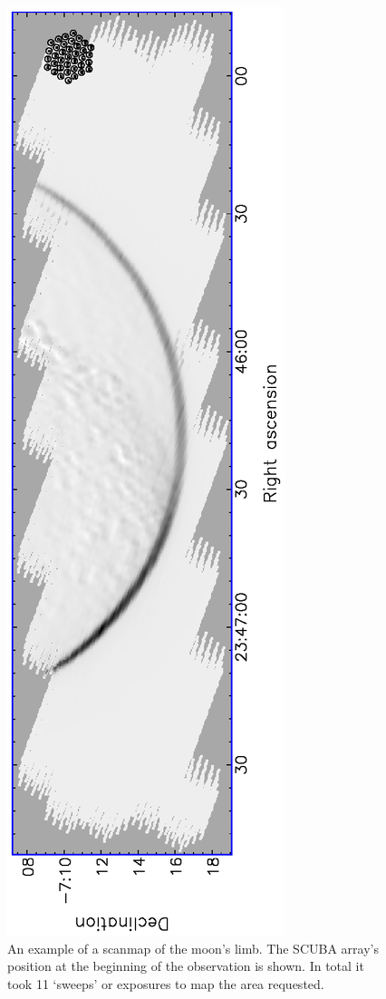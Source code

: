 \documentclass[twoside,11pt]{article}
\renewcommand{\_}{\texttt{\symbol{95}}}
\begin{document}
\begin{figure}
\begin{center}
\includegraphics[angle=-90,width=\textwidth]{sc11_fig8.eps}
\caption{An example of a scanmap of the moon's limb. The SCUBA 
array's position at the beginning of the observation is shown.  In
total it took 11 `sweeps' or exposures to map the area requested.}

\label{fig:moon}
\end{center}
\end{figure}
\end{document}
